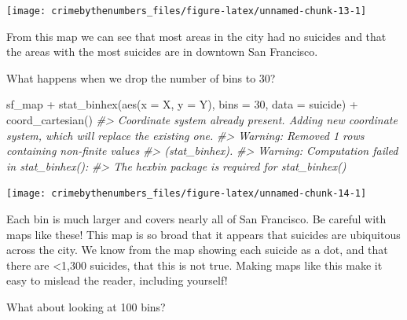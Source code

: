 \documentclass[
]{krantz}
\makeatletter
\newenvironment{Shaded}{\begin{snugshade}}{\end{snugshade}}
\newcommand{\AttributeTok}[1]{\textcolor[rgb]{0.61,0.61,0.61}{#1}}
\newcommand{\CommentTok}[1]{\textcolor[rgb]{0.37,0.37,0.37}{\textit{#1}}}
\newcommand{\DecValTok}[1]{\textcolor[rgb]{0.06,0.06,0.06}{#1}}
\newcommand{\FunctionTok}[1]{\textcolor[rgb]{0,0,0}{#1}}
\newcommand{\NormalTok}[1]{#1}
\newcommand{\SpecialCharTok}[1]{\textcolor[rgb]{0,0,0}{#1}}
\newenvironment{kframe}{%
\medskip{}
\setlength{\fboxsep}{.8em}
 \def\at@end@of@kframe{}%
 \ifinner\ifhmode%
  \def\at@end@of@kframe{\end{minipage}}%
  \begin{minipage}{\columnwidth}%
 \fi\fi%
 \def\FrameCommand##1{\hskip\@totalleftmargin \hskip-\fboxsep
 \colorbox{shadecolor}{##1}\hskip-\fboxsep
     \hskip-\linewidth \hskip-\@totalleftmargin \hskip\columnwidth}%
 \MakeFramed {\advance\hsize-\width
   \@totalleftmargin\z@ \linewidth\hsize
   \@setminipage}}%
 {\par\unskip\endMakeFramed%
 \at@end@of@kframe}
\renewenvironment{Shaded}{\begin{kframe}}{\end{kframe}}
\makeatother
\begin{document}
\begin{center}\texttt{[image: crimebythenumbers\_files/figure-latex/unnamed-chunk-13-1]} \end{center}

From this map we can see that most areas in the city had no suicides and that the areas with the most suicides are in downtown San Francisco.

What happens when we drop the number of bins to 30?

\begin{Shaded}
\begin{Highlighting}[]
\NormalTok{sf\_map }\SpecialCharTok{+} \FunctionTok{stat\_binhex}\NormalTok{(}\FunctionTok{aes}\NormalTok{(}\AttributeTok{x =}\NormalTok{ X, }\AttributeTok{y =}\NormalTok{ Y), }\AttributeTok{bins =} \DecValTok{30}\NormalTok{, }\AttributeTok{data =}\NormalTok{ suicide) }\SpecialCharTok{+}
  \FunctionTok{coord\_cartesian}\NormalTok{()}
\CommentTok{\#\textgreater{} Coordinate system already present. Adding new coordinate system, which will replace the existing one.}
\CommentTok{\#\textgreater{} Warning: Removed 1 rows containing non{-}finite values}
\CommentTok{\#\textgreater{} (stat\_binhex).}
\CommentTok{\#\textgreater{} Warning: Computation failed in \textasciigrave{}stat\_binhex()\textasciigrave{}:}
\CommentTok{\#\textgreater{} The \textasciigrave{}hexbin\textasciigrave{} package is required for \textasciigrave{}stat\_binhex()\textasciigrave{}}
\end{Highlighting}
\end{Shaded}

\begin{center}\texttt{[image: crimebythenumbers\_files/figure-latex/unnamed-chunk-14-1]} \end{center}

Each bin is much larger and covers nearly all of San Francisco. Be careful with maps like these! This map is so broad that it appears that suicides are ubiquitous across the city. We know from the map showing each suicide as a dot, and that there are \textless1,300 suicides, that this is not true. Making maps like this make it easy to mislead the reader, including yourself!

What about looking at 100 bins?
\end{document}
